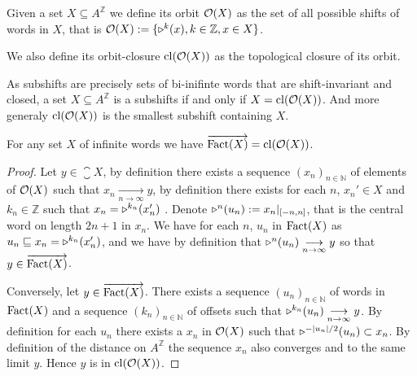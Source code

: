 \begin{definition}
	Given a set $X\subseteq A^{\mathbb{Z}}$ we define its orbit $\mathcal{O}(X)$ as the set of all possible shifts of words in $X$, that is $\orbit{X}:= \{ \shift{k}{}(x) , k\in \mathbb{Z}, x \in X\}$.
	
	We also define its orbit-closure $\mathrm{cl}(\mathcal{O}(X))$ as the topological closure of its orbit.
\end{definition}

As subshifts are precisely sets of bi-inifinte words that are shift-invariant and closed, a set $X\subseteq A^{\mathbb{Z}}$ is a subshifts if and only if $X= \mathrm{cl}(\mathcal{O}(X))$. And more generaly $\mathrm{cl}(\mathcal{O}(X))$ is the smallest subshift containing $X$.
\begin{lemma}
	For any set $X$ of infinite words we have $\overrightarrow{\mathrm{Fact}(X)} = \mathrm{cl}(\mathcal{O}(X))$.
	\label{lemma:lim-factor}
\end{lemma}

\begin{proof}
	Let $y \in \closure{X}$, by definition there exists a sequence $(x_n)_{n \in \mathbb{N}}$ of elements of $\mathcal{O}(X)$ such that $x_n \underset{n\to\infty}{\longrightarrow}y$, by definition there exists for each $n$, $x_n'\in X$ and $k_n\in \mathbb{Z}$ such that $x_n = \shift{k_n}{}(x_n')$ .
	Denote $\shift{n}{}(u_n):= x_n|_{[-n,n]}$, that is the central word on length $2n+1$ in $x_n$.
	We have for each $n$, $u_n$ in $\mathrm{Fact}(X)$ as $u_n \sqsubseteq x_n = \shift{k_n}{}(x_n')$, and we have by definition that $\shift{n}{}(u_n) \underset{n\to\infty}{\longrightarrow} y$ so that $y\in \overrightarrow{\mathrm{Fact}(X)}$.
	
	Conversely, let $y \in \overrightarrow{\mathrm{Fact}(X)}$. There exists a sequence $(u_n)_{n\in\mathbb{N}}$ of words in $\mathrm{Fact}(X)$ and a sequence $(k_n)_{n\in \mathbb{N}}$ of offsets such that $\shift{k_n}{}(u_n) \underset{n\to\infty}{\longrightarrow} y$.
	By definition for each $u_n$ there exists a $x_n$ in $\mathcal{O}(X)$ such that $\shift{-|u_n|/2}{}(u_n) \subset x_n$.
	By definition of the distance on $A^{\mathbb{Z}}$ the sequence $x_n$ also converges and to the same limit $y$. Hence $y$ is in $\mathrm{cl}(\mathcal{O}(X))$.  
\end{proof}

